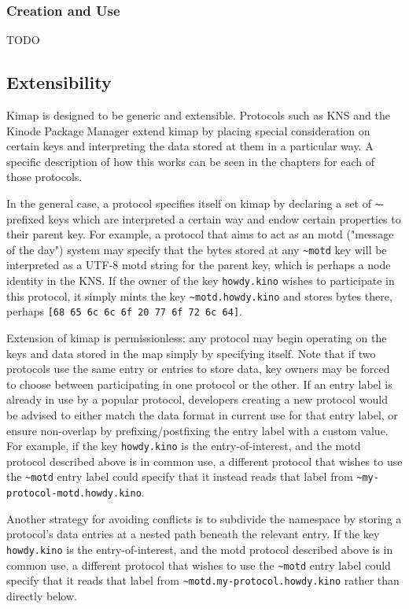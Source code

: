 \documentclass[runningheads]{llncs}
\begin{document}
\subsubsection{Creation and Use}

TODO

\subsection{Extensibility}

Kimap is designed to be generic and extensible.
Protocols such as KNS and the Kinode Package Manager extend kimap by placing special consideration on certain keys and interpreting the data stored at them in a particular way.
A specific description of how this works can be seen in the chapters for each of those protocols.

In the general case, a protocol specifies itself on kimap by declaring a set of \verb|~|-prefixed keys which are interpreted a certain way and endow certain properties to their parent key. For example, a protocol that aims to act as an motd ("message of the day") system may specify that the bytes stored at any \verb|~motd| key will be interpreted as a UTF-8 motd string for the parent key, which is perhaps a node identity in the KNS. If the owner of the key \verb|howdy.kino| wishes to participate in this protocol, it simply mints the key \verb|~motd.howdy.kino| and stores bytes there, perhaps \verb|[68 65 6c 6c 6f 20 77 6f 72 6c 64]|.

Extension of kimap is permissionless: any protocol may begin operating on the keys and data stored in the map simply by specifying itself.
Note that if two protocols use the same entry or entries to store data, key owners may be forced to choose between participating in one protocol or the other.
If an entry label is already in use by a popular protocol, developers creating a new protocol would be advised to either match the data format in current use for that entry label, or ensure non-overlap by prefixing/postfixing the entry label with a custom value.
For example, if the key \verb|howdy.kino| is the entry-of-interest, and the motd protocol described above is in common use, a different protocol that wishes to use the \verb|~motd| entry label could specify that it instead reads that label from \verb|~my-protocol-motd.howdy.kino|.

Another strategy for avoiding conflicts is to subdivide the namespace by storing a protocol's data entries at a nested path beneath the relevant entry.
If the key \verb|howdy.kino| is the entry-of-interest, and the motd protocol described above is in common use, a different protocol that wishes to use the \verb|~motd| entry label could specify that it reads that label from \verb|~motd.my-protocol.howdy.kino| rather than directly below.
\end{document}

